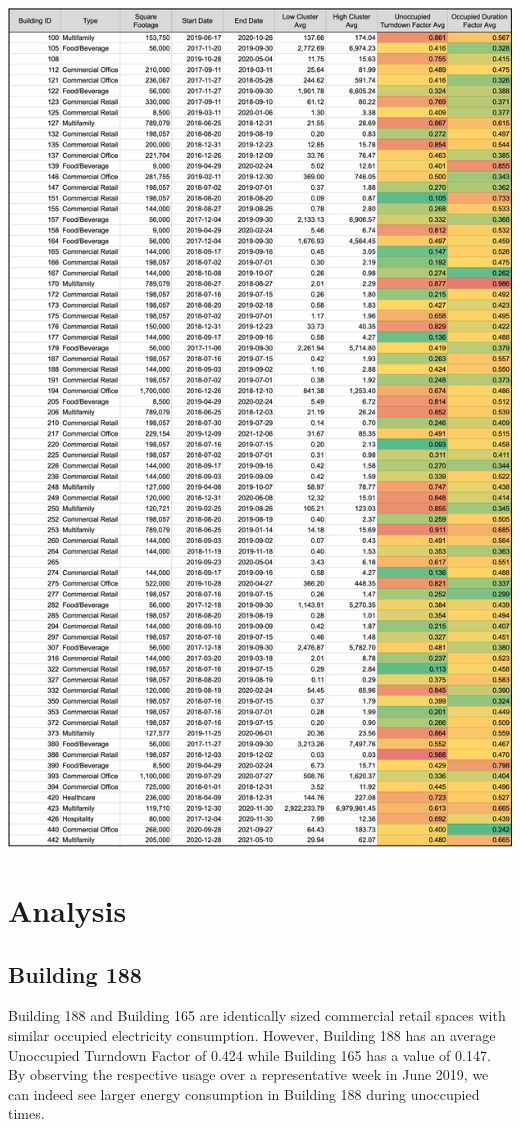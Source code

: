\documentclass[a4paper]{article}
\begin{document}
\includegraphics[width=\columnwidth]{./images/KPI_Result_Table.png}

\section{Analysis}

\subsection{Building 188}

Building 188 and Building 165 are identically sized commercial retail spaces with similar occupied electricity consumption. However, Building 188 has an average Unoccupied Turndown Factor of 0.424 while Building 165 has a value of 0.147. By observing the respective usage over a representative week in June 2019, we can indeed see larger energy consumption in Building 188 during unoccupied times.
\end{document}
